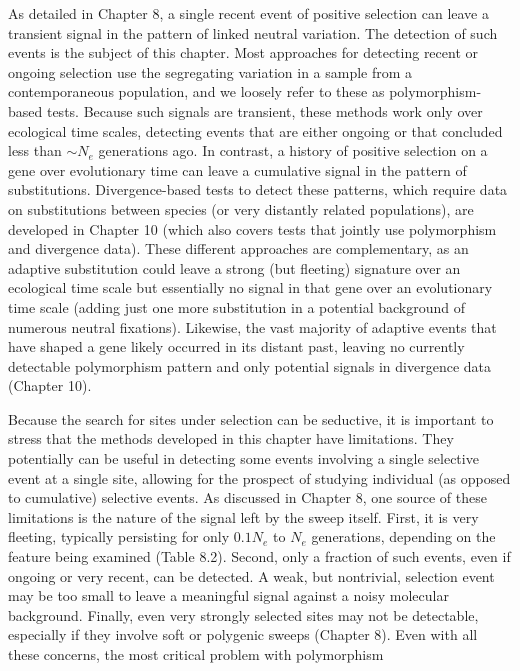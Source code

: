 \documentclass{article}
\begin{document}
As detailed in Chapter 8, a single recent event of positive selection can leave a transient signal in the pattern of linked neutral variation. The detection of such events is the subject of this chapter. Most approaches for detecting recent or ongoing selection use the segregating variation in a sample from a contemporaneous population, and we loosely refer to these as polymorphism-based tests. Because such signals are transient, these methods work only over ecological time scales, detecting events that are either ongoing or that concluded less than  $ \sim N_{e} $ generations ago. In contrast, a history of positive selection on a gene over evolutionary time can leave a cumulative signal in the pattern of substitutions. Divergence-based tests to detect these patterns, which require data on substitutions between species (or very distantly related populations), are developed in Chapter 10 (which also covers tests that jointly use polymorphism and divergence data). These different approaches are complementary, as an adaptive substitution could leave a strong (but fleeting) signature over an ecological time scale but essentially no signal in that gene over an evolutionary time scale (adding just one more substitution in a potential background of numerous neutral fixations). Likewise, the vast majority of adaptive events that have shaped a gene likely occurred in its distant past, leaving no currently detectable polymorphism pattern and only potential signals in divergence data (Chapter 10).

Because the search for sites under selection can be seductive, it is important to stress that the methods developed in this chapter have limitations. They potentially can be useful in detecting some events involving a single selective event at a single site, allowing for the prospect of studying individual (as opposed to cumulative) selective events. As discussed in Chapter 8, one source of these limitations is the nature of the signal left by the sweep itself. First, it is very fleeting, typically persisting for only  $ 0.1N_{e} $ to  $ N_{e} $ generations, depending on the feature being examined (Table 8.2). Second, only a fraction of such events, even if ongoing or very recent, can be detected. A weak, but nontrivial, selection event may be too small to leave a meaningful signal against a noisy molecular background. Finally, even very strongly selected sites may not be detectable, especially if they involve soft or polygenic sweeps (Chapter 8). Even with all these concerns, the most critical problem with polymorphism
\end{document}
